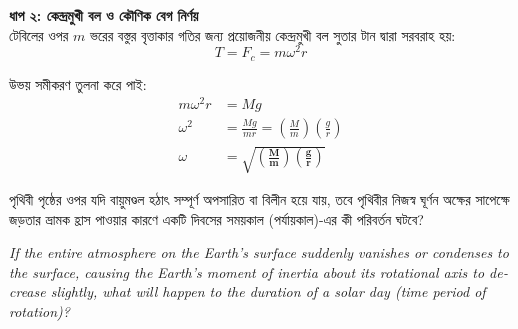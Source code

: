 \documentclass[12pt, a4paper]{article}
\begin{document}
{{\begin{tcolorbox}[solutionbox={সমাধান (Solution)}]
    \vspace{0.5em}
    \noindent\textbf{ধাপ ২: কেন্দ্রমুখী বল ও কৌণিক বেগ নির্ণয়} \\
    টেবিলের ওপর $m$ ভরের বস্তুর বৃত্তাকার গতির জন্য প্রয়োজনীয় কেন্দ্রমুখী বল সুতার টান দ্বারা সরবরাহ হয়:
    \[ T = F_c = m \omega^2 r \]
    
    উভয় সমীকরণ তুলনা করে পাই:
    \begin{align*}
        m \omega^2 r &= M g \\
        \omega^2 &= \frac{M g}{m r} = \left(\frac{M}{m}\right)\left(\frac{g}{r}\right) \\
        \omega &= \mathbf{\sqrt{\left(\frac{M}{m}\right)\left(\frac{g}{r}\right)}}
    \end{align*}
\end{tcolorbox}

\newpage

\begin{tcolorbox}[questionbox={প্রশ্ন (Question) 33}]
    \noindent
    পৃথিবী পৃষ্ঠের ওপর যদি বায়ুমণ্ডল হঠাৎ সম্পূর্ণ অপসারিত বা বিলীন হয়ে যায়, তবে পৃথিবীর নিজস্ব ঘূর্ণন অক্ষের সাপেক্ষে জড়তার ভ্রামক হ্রাস পাওয়ার কারণে একটি দিবসের সময়কাল (পর্যায়কাল)-এর কী পরিবর্তন ঘটবে?
    
    \vspace{0.8em}
    \begin{english}
    \noindent\textit{\color{darkgray}
    If the entire atmosphere on the Earth's surface suddenly vanishes or condenses to the surface, causing the Earth's moment of inertia about its rotational axis to decrease slightly, what will happen to the duration of a solar day (time period of rotation)?
    }
    \end{english}
\end{tcolorbox}

\vspace{1em}
\begin{center}
\end{center}}}
\end{document}
